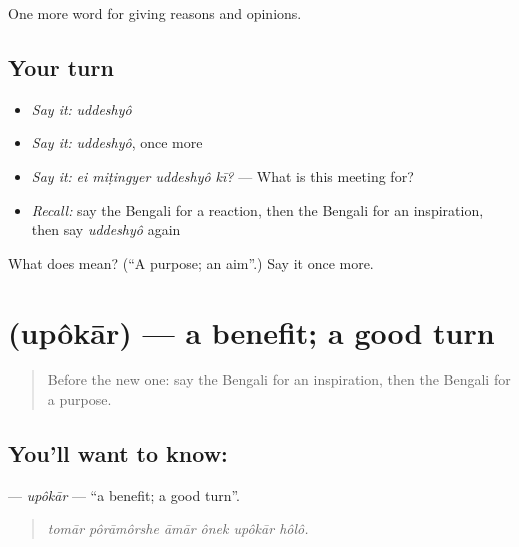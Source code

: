 \begin{grammarlens}[title={What you've built}]
One more word for giving reasons and opinions.
\end{grammarlens}

\subsection*{Your turn}
\begin{itemize}
\raggedright
  \item \emph{Say it:} \emph{uddeshyô}
  \item \emph{Say it:} \emph{uddeshyô}, once more
  \item \emph{Say it:} \emph{ei miṭingyer uddeshyô kī?} — What is this meeting for?
  \item \emph{Recall:} say the Bengali for a reaction, then the Bengali for an inspiration, then say \emph{uddeshyô} again
\end{itemize}

\begin{tcolorbox}[breakable,colback=teal!4,colframe=teal!35!black,title={Before you move on}]
What does  mean? (\textquotedblleft{}A purpose; an aim\textquotedblright{}.) Say it once more.
\end{tcolorbox}
\section[\texorpdfstring{\bn{উপকার} (upôkār)}{উপকার (upôkār)}]{ (upôkār) — a benefit; a good turn}

\label{lesson:BN-C331-upokar}



\begin{quote}
Before the new one: say the Bengali for an inspiration, then the Bengali for a purpose.
\end{quote}

\subsection*{You'll want to know: }
\textbf{} — \emph{upôkār} — \textquotedblleft{}a benefit; a good turn\textquotedblright{}.

\begin{quote}
     
\end{quote}

\begin{quote}
\emph{tomār pôrāmôrshe āmār ônek upôkār hôlô.}
\end{quote}

